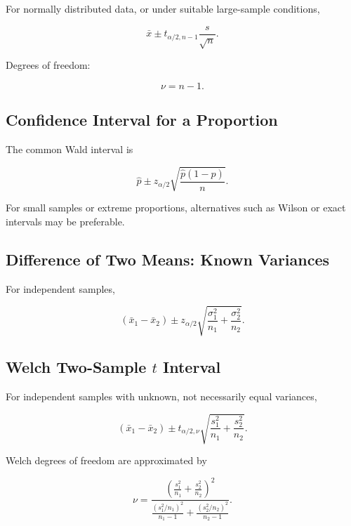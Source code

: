 For normally distributed data, or under suitable large-sample conditions,

\[
\boxed{
\bar{x}
\pm
t_{\alpha/2,n-1}
\frac{
s
}{
\sqrt n
}.
}
\]

Degrees of freedom:

\[
\boxed{
\nu=n-1.
}
\]

\subsection{Confidence Interval for a Proportion}
\label{subsec:ci-proportion-reference}

The common Wald interval is

\[
\boxed{
\hat p
\pm
z_{\alpha/2}
\sqrt{
\frac{
\hat p(1-\hat p)
}{
n
}
}.
}
\]

For small samples or extreme proportions, alternatives such as Wilson or
exact intervals may be preferable.

\subsection{Difference of Two Means: Known Variances}
\label{subsec:ci-two-means-known-variances}

For independent samples,

\[
\boxed{
(\bar{x}_1-\bar{x}_2)
\pm
z_{\alpha/2}
\sqrt{
\frac{
\sigma_1^2
}{
n_1
}
+
\frac{
\sigma_2^2
}{
n_2
}
}.
}
\]

\subsection{Welch Two-Sample \(t\) Interval}
\label{subsec:welch-two-sample-interval}

For independent samples with unknown, not necessarily equal variances,

\[
\boxed{
(\bar{x}_1-\bar{x}_2)
\pm
t_{\alpha/2,\nu}
\sqrt{
\frac{
s_1^2
}{
n_1
}
+
\frac{
s_2^2
}{
n_2
}
}.
}
\]

Welch degrees of freedom are approximated by

\[
\boxed{
\nu
=
\frac{
\left(
\frac{s_1^2}{n_1}
+
\frac{s_2^2}{n_2}
\right)^2
}{
\frac{
(s_1^2/n_1)^2
}{
n_1-1
}
+
\frac{
(s_2^2/n_2)^2
}{
n_2-1
}
}.
}
\]

